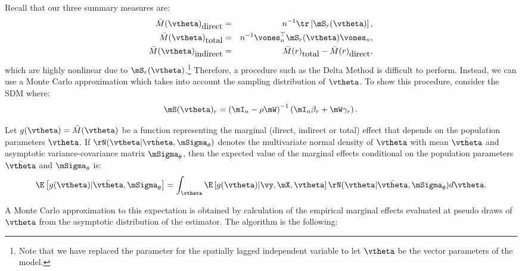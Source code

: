 \documentclass[english,12pt]{book}\usepackage[]{graphicx}\usepackage[]{xcolor}
\begin{document}
Recall that our three summary measures are:
\begin{eqnarray*}
\bar{M}(\vtheta)_{\mbox{direct}} & = & n^{-1}\tr\left[\mS_r(\vtheta)\right], \\
\bar{M}(\vtheta)_{\mbox{total}} & = & n^{-1}\vones_n^\top\mS_r(\vtheta)\vones_n, \\
\bar{M}(\vtheta)_{\mbox{indirect}} & = & \bar{M}(r)_{\mbox{total}} - \bar{M}(r)_{\mbox{direct}},
\end{eqnarray*}
%
which are highly nonlinear due to $\mS_r(\vtheta)$.\footnote{Note that we have replaced the parameter for the spatially lagged independent variable to let $\vtheta$ be the vector parameters of the model. } Therefore, a procedure such as the Delta Method is difficult to perform. Instead, we can use a Monte Carlo approximation which takes into account the sampling distribution of $\vtheta$. To show this procedure, consider the SDM where:
\begin{equation*}
\mS(\vtheta)_r = \left(\mI_n - \rho\mW\right)^{-1}\left(\mI_n\beta_r + \mW\gamma_r\right).
\end{equation*}

Let $g(\vtheta)= \bar{M}(\vtheta)$ be a function representing the marginal (direct, indirect or total) effect that depends on the population parameters $\vtheta$. If $\rN(\vtheta|\bar{\vtheta}, \mSigma_{\theta})$ denotes the multivariate normal density of $\vtheta$ with mean $\bar{\vtheta}$ and asymptotic variance-covariance matrix $\mSigma_{\theta}$, then the expected value of the marginal effects conditional on the population parameters $\bar{\vtheta}$ and $\mSigma_{\theta}$ is:
\begin{equation*}
\E\left[g(\vtheta)|\bar{\vtheta}, \mSigma_{\theta}\right] = \int_{\vtheta}\E\left[g(\vtheta)|\vy, \mX, \vtheta\right]\rN(\vtheta|\bar{\vtheta}, \mSigma_{\theta})d\vtheta. 
\end{equation*}

A Monte Carlo approximation to this expectation is obtained by calculation of the empirical marginal effects evaluated at pseudo draws of $\vtheta$ from the asymptotic distribution of the estimator. The algorithm is the following:
\end{document}
